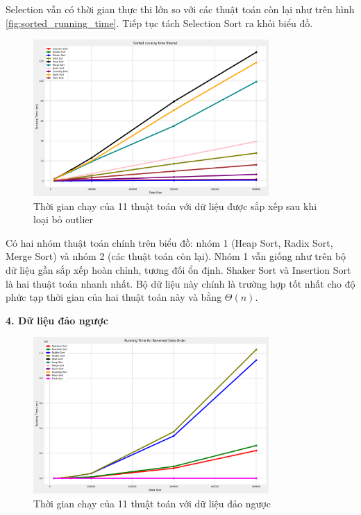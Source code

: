 Selection vẫn có thời gian thực thi lớn so với các thuật toán còn lại như trên hình \ref{fig:sorted_running_time}. Tiếp tục tách Selection Sort ra khỏi biểu đồ.

\begin{figure}[H]
    \centering
    \includegraphics[width=0.8\textwidth]{experimental_result/images/sorted_running_time_filtered.png}
    \caption{Thời gian chạy của 11 thuật toán với dữ liệu được sắp xếp sau khi loại bỏ outlier}
    \label{fig:sorted_running_time_filtered}
\end{figure}

Có hai nhóm thuật toán chính trên biểu đồ: nhóm 1 (Heap Sort, Radix Sort, Merge Sort) và nhóm 2 (các thuật toán còn lại). Nhóm 1 vẫn giống như trên bộ dữ liệu gần sắp xếp hoàn chỉnh, tương đối ổn định. Shaker Sort và Insertion Sort là hai thuật toán nhanh nhất. Bộ dữ liệu này chính là trường hợp tốt nhất cho độ phức tạp thời gian của hai thuật toán này và bằng $\Theta(n)$.

\textbf{4. Dữ liệu đảo ngược}

\begin{figure}[H]
    \centering
    \includegraphics[width=0.8\textwidth]{experimental_result/images/reversed_running_time.png}
    \caption{Thời gian chạy của 11 thuật toán với dữ liệu đảo ngược}
    \label{fig:reversed_running_time}
\end{figure}

